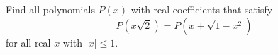 Find all polynomials $P(x)$ with real coefficients that satisfy \[P(x\sqrt{2})=P(x+\sqrt{1-x^2})\] for all real $x$ with $\left|x\right|\leq1$.
